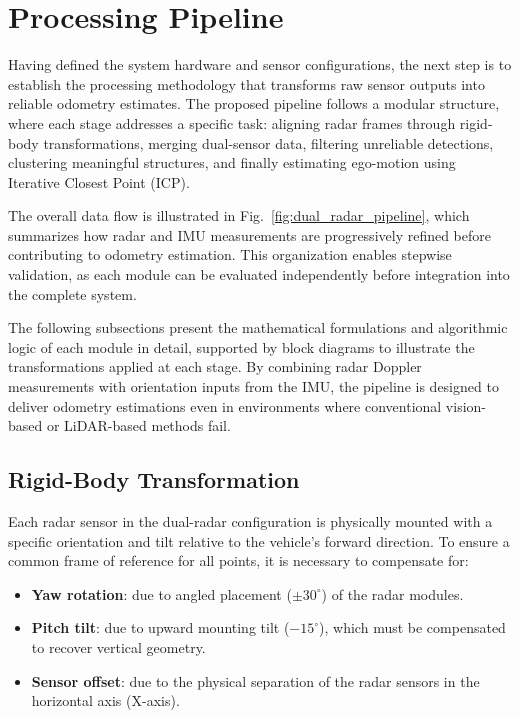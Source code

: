 \section{Processing Pipeline}
\label{sec:processing_pipeline}

Having defined the system hardware and sensor configurations, the next step is to establish the processing methodology that transforms raw sensor outputs into reliable odometry estimates.  
The proposed pipeline follows a modular structure, where each stage addresses a specific task: aligning radar frames through rigid-body transformations, merging dual-sensor data, filtering unreliable detections, clustering meaningful structures, and finally estimating ego-motion using Iterative Closest Point (ICP).  

The overall data flow is illustrated in Fig.~\ref{fig:dual_radar_pipeline}, which summarizes how radar and IMU measurements are progressively refined before contributing to odometry estimation.  
This organization enables stepwise validation, as each module can be evaluated independently before integration into the complete system.  

The following subsections present the mathematical formulations and algorithmic logic of each module in detail, supported by block diagrams to illustrate the transformations applied at each stage.  
By combining radar Doppler measurements with orientation inputs from the IMU, the pipeline is designed to deliver odometry estimations even in environments where conventional vision-based or LiDAR-based methods fail.

\vspace{0.5em}
\subsection{Rigid-Body Transformation}  

Each radar sensor in the dual-radar configuration is physically mounted with a specific orientation and tilt relative to the vehicle's forward direction.
To ensure a common frame of reference for all points, it is necessary to compensate for:

\begin{itemize}
    \item \textbf{Yaw rotation}: due to angled placement ($\pm30^\circ$) of the radar modules.
    \item \textbf{Pitch tilt}: due to upward mounting tilt ($-15^\circ$), which must be compensated to recover vertical geometry.
    \item \textbf{Sensor offset}: due to the physical separation of the radar sensors in the horizontal axis (X-axis).
\end{itemize}

